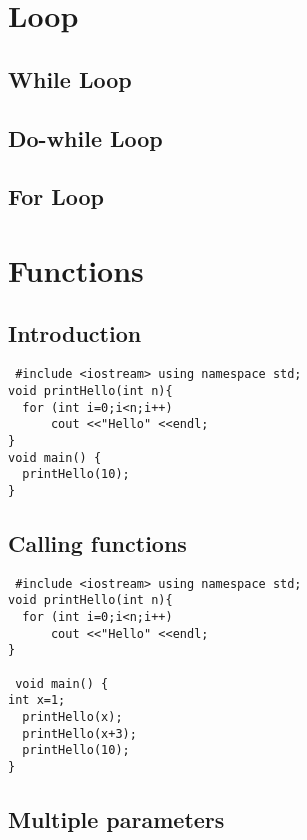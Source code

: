 \documentclass[a4paper]{article}
\begin{document}
\section{Loop}

\subsection{While Loop}

\subsection{Do-while Loop}

\subsection{For Loop}

\section{Functions}
\subsection{Introduction}
\begin{eg}

\end{eg}
\begin{lstlisting}
 #include <iostream> using namespace std;
void printHello(int n){
  for (int i=0;i<n;i++)
      cout <<"Hello" <<endl;
}
void main() {
  printHello(10);
}
\end{lstlisting}

\subsection{Calling functions}

\begin{eg}

\end{eg}
\begin{lstlisting}
 #include <iostream> using namespace std;
void printHello(int n){
  for (int i=0;i<n;i++)
      cout <<"Hello" <<endl;
}
 
 void main() {
int x=1;
  printHello(x);
  printHello(x+3);
  printHello(10);
}
\end{lstlisting}

\subsection{Multiple parameters}
\end{document}
